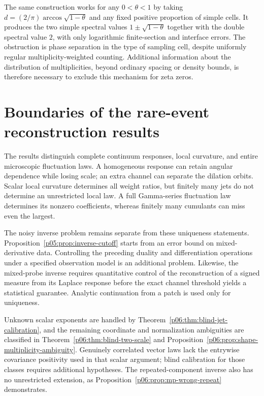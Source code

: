 \documentclass[11pt,letterpaper]{article}
\theoremstyle{definition}
\theoremstyle{remark}
\newcommand{\1}{\mathbf 1}
\begin{document}
The same construction works for any $0<\theta<1$ by taking
$d=(2/\pi)\arccos\sqrt{1-\theta}$ and any fixed positive
proportion of simple cells.  It produces the two simple spectral
values $1\pm\sqrt{1-\theta}$ together with the double spectral
value $2$, with only logarithmic finite-section and interface
errors.  The obstruction is phase separation in the type of
sampling cell, despite uniformly regular multiplicity-weighted
counting.  Additional information about the distribution of
multiplicities, beyond ordinary spacing or density bounds, is
therefore necessary to exclude this mechanism for zeta zeros.

\section{Boundaries of the rare-event reconstruction results}
\label{integrated:sec:rare-event-boundaries}

The results distinguish complete continuum responses, local curvature,
and entire microscopic fluctuation laws. A homogeneous response can
retain angular dependence while losing scale; an extra channel can
separate the dilation orbits. Scalar local curvature determines all
weight ratios, but finitely many jets do not determine an unrestricted
local law. A full Gamma-series fluctuation law determines its nonzero
coefficients, whereas finitely many cumulants can miss even the largest.

The noisy inverse problem remains separate from these uniqueness
statements. Proposition~\ref{p05:prop:inverse-cutoff} starts from an error
bound on mixed-derivative data. Controlling the preceding duality and
differentiation operations under a specified observation model is an
additional problem. Likewise, the mixed-probe inverse requires
quantitative control of the reconstruction of a signed measure from
its Laplace response before the exact channel threshold yields a
statistical guarantee. Analytic continuation from a patch is used
only for uniqueness.

Unknown scalar exponents are handled by
Theorem~\ref{p06:thm:blind-jet-calibration}, and the remaining coordinate
and normalization ambiguities are classified in
Theorem~\ref{p06:thm:blind-two-scale} and
Proposition~\ref{p06:prop:shape-multiplicity-ambiguity}. Genuinely
correlated vector laws lack the entrywise covariance positivity used
in that scalar argument; blind calibration for those classes requires
additional hypotheses. The repeated-component inverse also has no
unrestricted extension, as
Proposition~\ref{p06:prop:mp-wrong-repeat} demonstrates.
\end{document}
